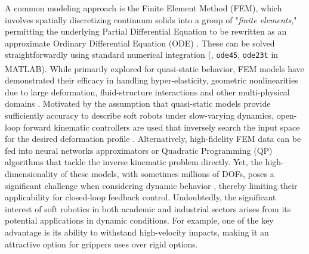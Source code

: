 A common modeling approach is the Finite Element Method (FEM), which involves spatially discretizing continuum solids into a group of "\textit{finite elements}," permitting the underlying Partial Differential Equation to be rewritten as an approximate Ordinary Differential Equation (ODE) \cite{Holzapfel2002,Kim2018}. These can be solved straightforwardly using standard numerical integration (\eg, \texttt{ode45}, \texttt{ode23t} in MATLAB\textsuperscript{\scriptsize\textregistered}).
%
While primarily explored for quasi-static behavior, FEM models have demonstrated their efficacy in handling hyper-elasticity, geometric nonlinearities due to large deformation, fluid-structure interactions and other multi-physical domains \cite{Xavier2022Jun,Hughes2016Nov,Smith2022_FEM,Moerman2018,Maas2012}. Motivated by the assumption that quasi-static models provide sufficiently accuracy to describe soft robots under slow-varying dynamics, open-loop forward kinematic controllers are used that inversely search the input space for the desired deformation profile \cite{Marchese2015,Bern2019,Marchese2016}. Alternatively, high-fidelity FEM data can be fed into neural networks approximators \cite{Fang2022Jun,Zheng2020May} or Quadratic Programming (QP) algorithms \cite{Bern2019} that tackle the inverse kinematic problem directly. Yet, the high-dimensionality of these models, with sometimes millions of DOFs, poses a significant challenge when considering dynamic behavior \cite{Goury2018,Duriez2013}, thereby limiting their applicability for closed-loop feedback control. Undoubtedly, the significant interest of soft robotics in both academic and industrial sectors arises from its potential applications in dynamic conditions. For example, one of the key advantage is its ability to withstand high-velocity impacts, making it an attractive option for grippers uses over rigid options.


